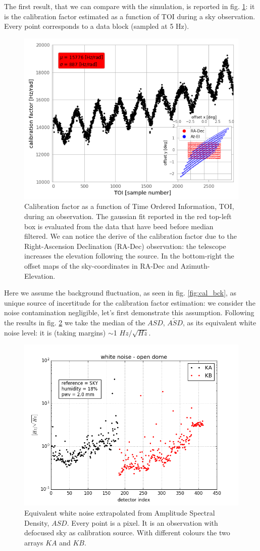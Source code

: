 \documentclass[twocolumn,traditabstract]{aa}\\
\begin{document}
The first result, that we can compare with the simulation, is reported in fig. \ref{fig:calfact}: it is the calibration factor estimated as a function of TOI during a sky observation. Every point corresponds to a data block (sampled at 5 Hz).

\begin{figure}[htf]
	\centering
	\includegraphics[width=.7\textwidth]{4.results/calfact.png}
	\caption{Calibration factor as a function of Time Ordered Information, TOI, during an observation. The gaussian fit reported in the red top-left box is evaluated from the data that have beed before median filtered. We can notice the derive of the calibration factor due to the Right-Ascension Declination (RA-Dec) observation: the telescope increases the elevation following the source. In the bottom-right the offset maps of the sky-coordinates in RA-Dec and Azimuth-Elevation.}
	\label{fig:calfact}
\end{figure}


Here we assume the background fluctuation, as seen in fig. \ref{fig:cal_bck}, as unique source of incertitude for the calibration factor estimation: we consider the noise contamination negligible, let's first demonstrate this assumption. Following the results in fig. \ref{fig:ASD} we take the median of the $ASD$, $\tilde{ASD}$, as its equivalent white noise level: it is (taking margins) $\sim$1 $Hz/\sqrt{Hz}$.

\begin{figure}[htf]
	\centering
	\includegraphics[width=.5\textwidth]{4.results/white_noise_index.png}
	\caption{Equivalent white noise extrapolated from Amplitude Spectral Density, $ASD$. Every point is a pixel. It is an observation with defocused sky as calibration source. With different colours the two arrays $KA$ and $KB$.}
	\label{fig:ASD}
\end{figure}
\end{document}
